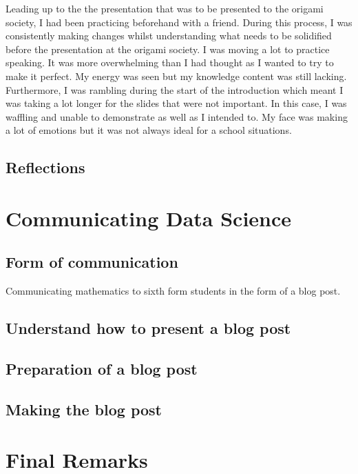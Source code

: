 \documentclass[12pt, a4paper,oneside]{book}
\numberwithin{equation}{section}
\begin{document}
Leading up to the the presentation that was to be presented to the origami society, I had been practicing beforehand with a friend. During this process, I was consistently making changes whilst understanding what needs to be solidified before the presentation at the origami society. I was moving a lot to practice speaking. It was more overwhelming than I had thought as I wanted to try to make it perfect. My energy was seen but my knowledge content was still lacking. Furthermore, I was rambling during the start of the introduction which meant I was taking a lot longer for the slides that were not important. In this case, I was waffling and unable to demonstrate as well as I intended to. My face was making a lot of emotions but it was not always ideal for a school situations.

\section{Reflections}\label{sec:x.x}

\chapter{Communicating Data Science}\label{ch:x}


\section{Form of communication}\label{sec:x.x}

Communicating mathematics to sixth form students in the form of a blog post.

\section{Understand how to present a blog post}\label{sec:x.x}


\section{Preparation of a blog post}\label{sec:x.x}


\section{Making the blog post}\label{sec:x.x}


\chapter{Final Remarks}\label{ch:concl}
\end{document}
